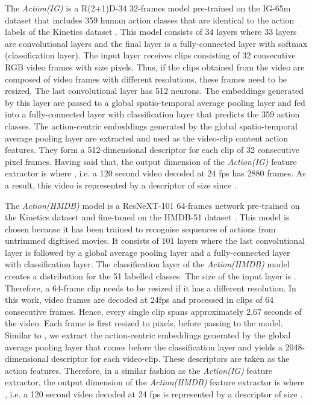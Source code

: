 \documentclass[review]{elsarticle}
\begin{document}
\begin{enumerate}[label = \Alph*.]
The \textit{Action(IG)} is a R(2+1)D-34 32-frames model \citep{tran2018closer} pre-trained on the IG-65m dataset \citep{ghadiyaram2019large} that includes 359 human action classes that are identical to the action labels of the Kinetics dataset \citep{carreira2017quo}. This model consists of 34 layers where 33 layers are convolutional layers and the final layer is a fully-connected layer with softmax (classification layer). The input layer receives clips consisting of 32 consecutive RGB video frames with size  pixels. Thus, if the clips obtained from the video are composed of video frames with different resolutions, these frames need to be resized. The last convolutional layer has 512 neurons. The embeddings generated by this layer are passed to a global spatio-temporal average pooling layer and fed into a fully-connected layer with classification layer that predicts the 359 action classes. The action-centric embeddings generated by the global spatio-temporal average pooling layer are extracted and used as the video-clip content action features. They form a 512-dimensional descriptor for each clip of 32 consecutive  pixel frames. Having said that, the output dimension of the \textit{Action(IG)} feature extractor is  where , i.e. a 120 second video decoded at 24 fps has 2880 frames. As a result, this video is represented by a descriptor of size  since . 


The \textit{Action(HMDB)} model is a ResNeXT-101 64-frames network \citep{hara2018can} pre-trained on the Kinetics dataset \citep{carreira2017quo} and fine-tuned on the HMDB-51 dataset \citep{kuehne2011hmdb}. This model is chosen because it has been trained to recognise sequences of actions from untrimmed digitised movies. It consists of 101 layers where the last convolutional layer is followed by a global average pooling layer and a fully-connected layer with classification layer. The classification layer of the \textit{Action(HMDB)} model creates a distribution for the 51 labelled classes. The size of the input layer is . Therefore, a 64-frame clip needs to be resized if it has a different resolution. In this work, video frames are decoded at 24fps and processed in clips of 64 consecutive frames. Hence, every single clip spans approximately 2.67 seconds of the video. Each frame is first resized to  pixels, before passing to the model. Similar to \citep{almeida2020visual}, we extract the action-centric embeddings generated by the global average pooling layer that comes before the classification layer and yields a 2048-dimensional descriptor for each video-clip. These descriptors are taken as the action features. Therefore, in a similar fashion as the \textit{Action(IG)} feature extractor, the output dimension of the \textit{Action(HMDB)} feature extractor is   where , i.e. a 120 second video decoded at 24 fps is represented by a descriptor of size .



\end{enumerate}
\end{document}
